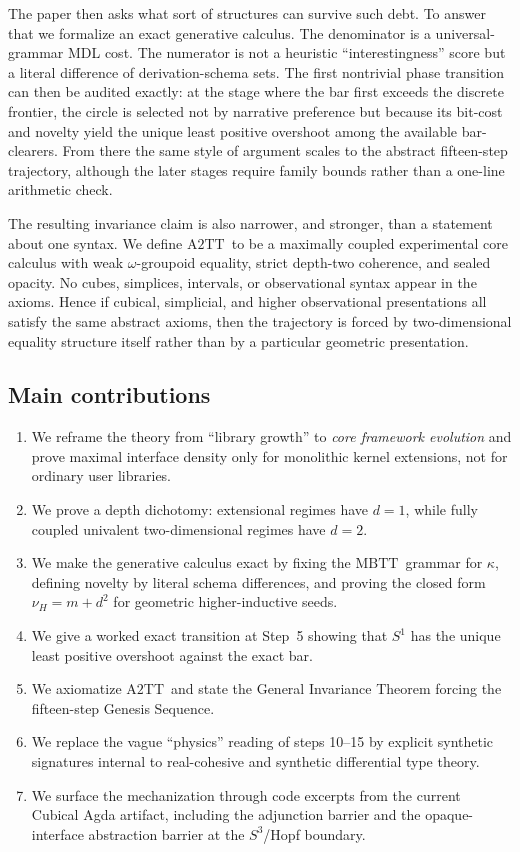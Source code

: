 \documentclass{lmcs}
\theoremstyle{plain}
\theoremstyle{definition}
\theoremstyle{remark}
\newcommand{\MBTT}{\ensuremath{\mathrm{MBTT}}}
\newcommand{\ATwo}{\ensuremath{\mathrm{A2TT}}}
\begin{document}
The paper then asks what sort of structures can survive such debt.
To answer that we formalize an exact generative calculus.
The denominator is a universal-grammar MDL cost.
The numerator is not a heuristic ``interestingness'' score but a literal difference of derivation-schema sets.
The first nontrivial phase transition can then be audited exactly: at the stage where the bar first exceeds the discrete frontier, the circle is selected not by narrative preference but because its bit-cost and novelty yield the unique least positive overshoot among the available bar-clearers.
From there the same style of argument scales to the abstract fifteen-step trajectory, although the later stages require family bounds rather than a one-line arithmetic check.

The resulting invariance claim is also narrower, and stronger, than a statement about one syntax.
We define \ATwo\ to be a maximally coupled experimental core calculus with weak $\omega$-groupoid equality, strict depth-two coherence, and sealed opacity.
No cubes, simplices, intervals, or observational syntax appear in the axioms.
Hence if cubical, simplicial, and higher observational presentations all satisfy the same abstract axioms, then the trajectory is forced by two-dimensional equality structure itself rather than by a particular geometric presentation.

\subsection{Main contributions}

\begin{enumerate}[label=(\roman*),nosep]
  \item We reframe the theory from ``library growth'' to \emph{core framework evolution} and prove maximal interface density only for monolithic kernel extensions, not for ordinary user libraries.
  \item We prove a depth dichotomy: extensional regimes have $d=1$, while fully coupled univalent two-dimensional regimes have $d=2$.
  \item We make the generative calculus exact by fixing the \MBTT\ grammar for $\kappa$, defining novelty by literal schema differences, and proving the closed form $\nu_H=m+d^2$ for geometric higher-inductive seeds.
  \item We give a worked exact transition at Step~5 showing that $S^1$ has the unique least positive overshoot against the exact bar.
  \item We axiomatize \ATwo\ and state the General Invariance Theorem forcing the fifteen-step Genesis Sequence.
  \item We replace the vague ``physics'' reading of steps 10--15 by explicit synthetic signatures internal to real-cohesive and synthetic differential type theory.
  \item We surface the mechanization through code excerpts from the current Cubical Agda artifact, including the adjunction barrier and the opaque-interface abstraction barrier at the $S^3$/Hopf boundary.
\end{enumerate}
\end{document}
